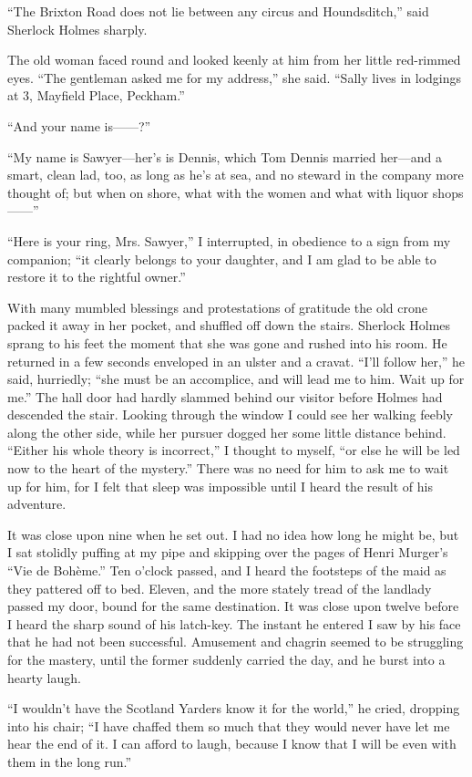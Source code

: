 \documentclass[12pt]{book}
\begin{document}
“The Brixton Road does not lie between any circus and Houndsditch,” said Sherlock Holmes sharply. 

The old woman faced round and looked keenly at him from her little red-rimmed eyes. “The gentleman asked me for my address,” she said. “Sally lives in lodgings at 3, Mayfield Place, Peckham.” 

“And your name is——?” 

“My name is Sawyer—her’s is Dennis, which Tom Dennis married her—and a smart, clean lad, too, as long as he’s at sea, and no steward in the company more thought of; but when on shore, what with the women and what with liquor shops——” 

“Here is your ring, Mrs. Sawyer,” I interrupted, in obedience to a sign from my companion; “it clearly belongs to your daughter, and I am glad to be able to restore it to the rightful owner.” 

With many mumbled blessings and protestations of gratitude the old crone packed it away in her pocket, and shuffled off down the stairs. Sherlock Holmes sprang to his feet the moment that she was gone and rushed into his room. He returned in a few seconds enveloped in an ulster and a cravat. “I’ll follow her,” he said, hurriedly; “she must be an accomplice, and will lead me to him. Wait up for me.” The hall door had hardly slammed behind our visitor before Holmes had descended the stair. Looking through the window I could see her walking feebly along the other side, while her pursuer dogged her some little distance behind. “Either his whole theory is incorrect,” I thought to myself, “or else he will be led now to the heart of the mystery.” There was no need for him to ask me to wait up for him, for I felt that sleep was impossible until I heard the result of his adventure. 

It was close upon nine when he set out. I had no idea how long he might be, but I sat stolidly puffing at my pipe and skipping over the pages of Henri Murger’s “Vie de Bohème.” Ten o’clock passed, and I heard the footsteps of the maid as they pattered off to bed. Eleven, and the more stately tread of the landlady passed my door, bound for the same destination. It was close upon twelve before I heard the sharp sound of his latch-key. The instant he entered I saw by his face that he had not been successful. Amusement and chagrin seemed to be struggling for the mastery, until the former suddenly carried the day, and he burst into a hearty laugh. 

“I wouldn’t have the Scotland Yarders know it for the world,” he cried, dropping into his chair; “I have chaffed them so much that they would never have let me hear the end of it. I can afford to laugh, because I know that I will be even with them in the long run.” 
\end{document}
